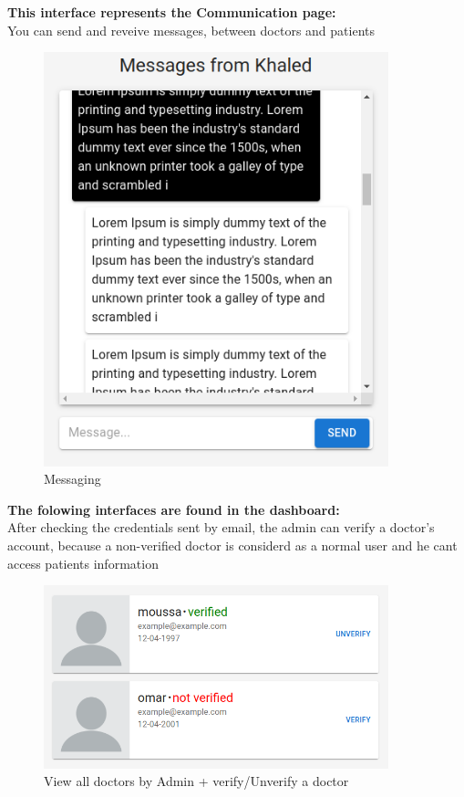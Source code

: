         
        \noindent \textbf{This interface represents the Communication page:} \\
        You can send and reveive messages, between doctors and patients
        \begin{figure}[H]
        \begin{center}
        \includegraphics[width=10cm]{./diagnosis-system/presentation-of-app/messeges.png}
        \end{center}
        \caption{Messaging}
        \label{fig:}
        \end{figure}

        
        \noindent \textbf{The folowing interfaces are found in the dashboard:} \\
        After checking the credentials sent by email, the admin can verify a doctor's account, because a non-verified doctor is considerd as a normal user and he cant access patients information 
        \begin{figure}[H]
        \begin{center}
        \includegraphics[width=10cm]{./diagnosis-system/presentation-of-app/verify-doctors.png}
        \end{center}
        \caption{View all doctors by Admin + verify/Unverify a doctor}
        \label{fig:}
        \end{figure}


